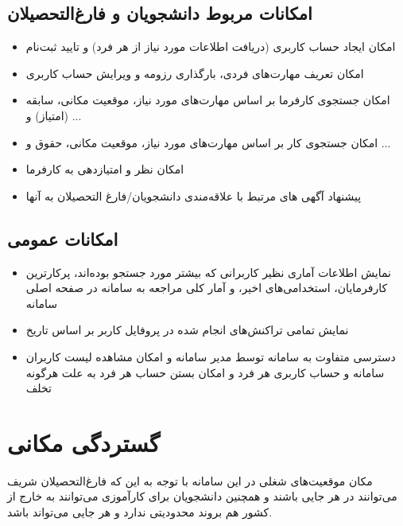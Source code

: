 \subsection{
امکانات مربوط دانشجویان و فارغ‌التحصیلان}
\begin{itemize}
	\item 
امکان ایجاد حساب کاربری (دریافت اطلاعات مورد نیاز از هر فرد) و تایید ثبت‌نام 
\item 
امکان تعریف مهارت‌های فردی، بارگذاری رزومه و ویرایش حساب کاربری 
 \item 
امکان جستجوی کارفرما بر اساس مهارت‌های مورد نیاز، موقعیت مکانی، سابقه (امتیاز) و ...  
\item
امکان جستجوی کار بر اساس مهارت‌های مورد نیاز، موقعیت مکانی، حقوق و ...  
 \item 
امکان نظر و امتیازدهی به کارفرما
   \item 
پیشنهاد آگهی های مرتبط با علاقه‌مندی دانشجویان/فارغ التحصیلان به آنها
\end{itemize}
\subsection{
امکانات عمومی}
\begin{itemize}
	\item
	نمایش اطلاعات آماری نظیر کاربرانی که بیشتر مورد جستجو بوده‌اند، پرکارترین کارفرمایان،
استخدامی‌های اخیر، و آمار کلی مراجعه به سامانه در صفحه اصلی سامانه 
	\item
	نمایش تمامی تراکنش‌های انجام شده در پروفایل کاربر بر اساس تاریخ
	\item
	دسترسی متفاوت به سامانه توسط مدیر سامانه و امکان مشاهده لیست کاربران سامانه و حساب کاربری هر فرد و امکان بستن حساب هر فرد به علت هرگونه تخلف
\end{itemize}

\section{گستردگی مکانی}
مکان موقعیت‌های شغلی در این سامانه با توجه به این که فارغ‌التحصیلان شریف می‌توانند در هر جایی باشند و همچنین دانشجویان برای کارآموزی می‌توانند به خارج از کشور هم بروند محدودیتی ندارد و هر جایی می‌تواند باشد.
